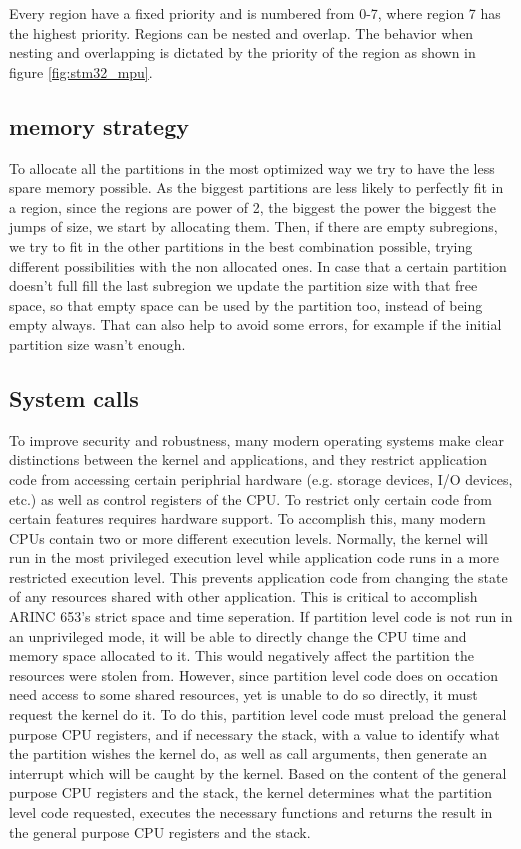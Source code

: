Every region have a fixed priority and is numbered from 0-7, where region 7 has the highest priority.
Regions can be nested and overlap.
The behavior when nesting and overlapping is dictated by the priority of the region as shown in figure \ref{fig:stm32_mpu}.

\subsection{memory strategy}
To allocate all the partitions in the most optimized way we try to have the less spare memory possible. As
 the biggest partitions are less likely to perfectly fit in a region, since the regions are power of 2,
  the biggest the power the biggest the jumps of size, we start by allocating them. Then, if there are
   empty subregions, we try to fit in the other partitions in the best combination possible, trying
    different possibilities with the non allocated ones. In case that a certain partition doesn't full
    fill the last subregion we update the partition size with that free space, so that empty space can be
    used by the partition too, instead of being empty always. That can also help to avoid some errors, 
    for example if the initial partition size wasn't enough.



\subsection{System calls}
To improve security and robustness, many modern operating systems make clear 
distinctions between the kernel and applications, and they restrict application
code from accessing certain periphrial hardware (e.g. storage devices, I/O
devices, etc.) as well as control registers of the CPU. 
To restrict only certain code from certain features requires hardware support.
To accomplish this, many modern CPUs contain two or more different execution
levels. Normally, the kernel will run in the most privileged execution level
while application code runs in a more restricted execution level. This prevents
application code from changing the state of any resources shared with other
application. This is critical to accomplish ARINC 653's strict space and time 
seperation. If partition level code is not run in an unprivileged mode, it will
be able to directly change the CPU time and memory space allocated to it. This
would negatively affect the partition the resources were stolen from. However,
since partition level code does on occation need access to some shared resources,
yet is unable to do so directly, it must request the kernel do it. To do this,
partition level code must preload the general purpose CPU registers, and if
necessary the stack, with a value to identify what the partition wishes the
kernel do, as well as call arguments, then generate an interrupt which will be
caught by the kernel. Based on the content of the general purpose CPU registers
and the stack, the kernel determines what the partition level code requested,
executes the necessary functions and returns the result in the general purpose 
CPU registers and the stack.

